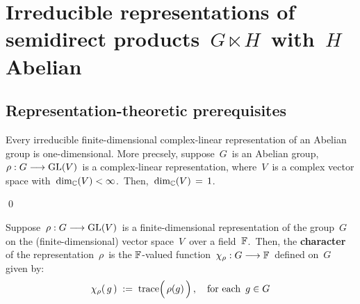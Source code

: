 

\chapter{Irreducible representations of semidirect products \,$G \ltimes\! H$\, with \,$H$\, Abelian}
\setcounter{theorem}{0}
\setcounter{equation}{0}


\renewcommand{\theenumi}{\roman{enumi}}
\renewcommand{\labelenumi}{\textnormal{(\theenumi)}$\;\;$}


\section{Representation-theoretic prerequisites}

\begin{proposition}
\mbox{}
\vskip 0.1cm
\noindent
Every irreducible finite-dimensional {\color{red}complex}-linear representation
of an {\color{red}Abelian} group is one-dimensional.
More precsely, suppose
\,$G$\, is an Abelian group,
\,$\rho : G \longrightarrow \textnormal{GL}(V)$\,
is a complex-linear representation, where
\,$V$\, is a complex vector space with \,$\dim_{\mathbb{C}}(V) < \infty$.\,
Then,
\,$\dim_{\mathbb{C}}(V) \,=\, 1$.\,
\end{proposition}
\proof

\qed

\vskip 0.5cm
\begin{definition}
\mbox{}
\vskip 0.1cm
\noindent
Suppose
\,$\rho : G \longrightarrow \textnormal{GL}(V)$\,
is a finite-dimensional representation of
the group \,$G$\,
on the (finite-dimensional) vector space \,$V$\,
over a field \,$\mathbb{F}$.\,
Then, the \textbf{character} of the representation
\,$\rho$\,
is the $\mathbb{F}$-valued function
\,$\chi_{\rho} : G \longrightarrow \mathbb{F}$\,
defined on \,$G$\, given by:
\begin{equation*}
\chi_{\rho}(\,g\,)
\; := \;
	\trace\!\left(\,\overset{{\color{white}.}}{\rho(g)}\,\right),
\quad
\textnormal{for each \,$g \in G$}
\end{equation*}
\end{definition}

